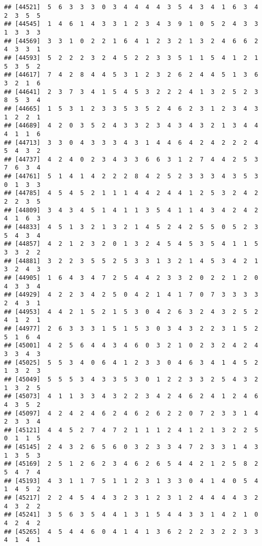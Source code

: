 \documentclass[
]{article}
\begin{document}
\begin{verbatim}
## [44521]  5  6  3  3  3  0  3  4  4  4  4  3  5  4  3  4  1  6  3  4  2  3  5  5
## [44545]  1  4  6  1  4  3  3  1  2  3  4  3  9  1  0  5  2  4  3  3  1  3  3  3
## [44569]  3  3  1  0  2  2  1  6  4  1  2  3  2  1  3  2  4  6  6  2  4  3  3  1
## [44593]  5  2  2  2  3  2  4  5  2  2  3  3  5  1  1  5  4  1  2  1  5  3  5  2
## [44617]  7  4  2  8  4  4  5  3  1  2  3  2  6  2  4  4  5  1  3  6  3  2  1  6
## [44641]  2  3  7  3  4  1  5  4  5  3  2  2  2  4  1  3  2  5  2  3  8  5  3  4
## [44665]  1  5  3  1  2  3  3  5  3  5  2  4  6  2  3  1  2  3  4  3  1  2  2  1
## [44689]  4  2  0  3  5  2  4  3  3  2  3  4  3  4  3  2  1  3  4  4  4  1  1  6
## [44713]  3  3  0  4  3  3  3  4  3  1  4  4  6  4  2  4  2  2  2  4  5  4  3  2
## [44737]  4  2  4  0  2  3  4  3  3  6  6  3  1  2  7  4  4  2  5  3  7  6  3  4
## [44761]  5  1  4  1  4  2  2  2  8  4  2  5  2  3  3  3  4  3  5  3  0  1  3  3
## [44785]  4  5  4  5  2  1  1  1  4  4  2  4  4  1  2  5  3  2  4  2  2  2  3  5
## [44809]  3  4  3  4  5  1  4  1  1  3  5  4  1  1  4  3  4  2  4  2  4  1  6  3
## [44833]  4  5  1  3  2  1  3  2  1  4  5  2  4  2  5  5  0  5  2  3  5  4  3  4
## [44857]  4  2  1  2  3  2  0  1  3  2  4  5  4  5  3  5  4  1  1  5  3  3  2  2
## [44881]  3  2  2  3  5  5  2  5  3  3  1  3  2  1  4  5  3  4  2  1  3  2  4  3
## [44905]  1  6  4  3  4  7  2  5  4  4  2  3  3  2  0  2  2  1  2  0  4  3  3  4
## [44929]  4  2  2  3  4  2  5  0  4  2  1  4  1  7  0  7  3  3  3  3  2  4  3  1
## [44953]  4  4  2  1  5  2  1  5  3  0  4  2  6  3  2  4  3  2  5  2  4  1  2  1
## [44977]  2  6  3  3  3  1  5  1  5  3  0  3  4  3  2  2  3  1  5  2  5  1  6  4
## [45001]  4  2  5  6  4  4  3  4  6  0  3  2  1  0  2  3  2  4  2  4  3  3  4  3
## [45025]  5  5  3  4  0  6  4  1  2  3  3  0  4  6  3  4  1  4  5  2  1  3  2  3
## [45049]  5  5  5  3  4  3  3  5  3  0  1  2  2  3  3  2  5  4  3  2  1  3  2  5
## [45073]  4  1  1  3  3  4  3  2  2  3  4  2  4  6  2  4  1  2  4  6  4  3  5  2
## [45097]  4  2  4  2  4  6  2  4  6  2  6  2  2  0  7  2  3  3  1  4  2  3  3  4
## [45121]  4  4  5  2  7  4  7  2  1  1  1  2  4  1  2  1  3  2  2  5  0  1  1  5
## [45145]  2  4  3  2  6  5  6  0  3  2  3  3  4  7  2  3  3  1  4  3  1  3  5  3
## [45169]  2  5  1  2  6  2  3  4  6  2  6  5  4  4  2  1  2  5  8  2  5  4  7  4
## [45193]  4  3  1  1  7  5  1  1  2  3  1  3  3  0  4  1  4  0  5  4  1  4  5  2
## [45217]  2  2  4  5  4  4  3  2  3  1  2  3  1  2  4  4  4  4  3  2  4  3  2  2
## [45241]  3  5  6  3  5  4  4  1  3  1  5  4  4  3  3  1  4  2  1  0  4  2  4  2
## [45265]  4  5  4  4  6  0  4  1  4  1  3  6  2  2  2  3  2  2  3  3  4  1  4  1

\end{verbatim}
\end{document}
